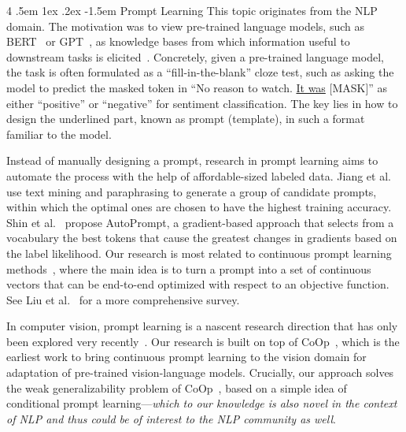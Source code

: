 \documentclass[10pt,twocolumn,letterpaper]{article}
\makeatletter
\renewcommand\paragraph{
  \@startsection{paragraph} %
  {4} %
  {\z@} %
  {.5em \@plus1ex \@minus.2ex} %
  {-1.5em} %
  {\normalfont\normalsize\bfseries} %
}
\makeatother
\begin{document}
\paragraph{Prompt Learning}
This topic originates from the NLP domain. The motivation was to view pre-trained language models, such as BERT~\cite{devlin2019bert} or GPT~\cite{radford2019language}, as knowledge bases from which information useful to downstream tasks is elicited~\cite{petroni2019language}. Concretely, given a pre-trained language model, the task is often formulated as a ``fill-in-the-blank'' cloze test, such as asking the model to predict the masked token in ``No reason to watch. \underline{It was} [MASK]'' as either ``positive'' or ``negative'' for sentiment classification. The key lies in how to design the underlined part, known as prompt (template), in such a format familiar to the model.

Instead of manually designing a prompt, research in prompt learning aims to automate the process with the help of affordable-sized labeled data. Jiang et al.~\cite{jiang2020can} use text mining and paraphrasing to generate a group of candidate prompts, within which the optimal ones are chosen to have the highest training accuracy. Shin et al.~\cite{shin2020autoprompt} propose AutoPrompt, a gradient-based approach that selects from a vocabulary the best tokens that cause the greatest changes in gradients based on the label likelihood. Our research is most related to continuous prompt learning methods~\cite{zhong2021factual,li2021prefix,lester2021power}, where the main idea is to turn a prompt into a set of continuous vectors that can be end-to-end optimized with respect to an objective function. See Liu et al.~\cite{liu2021pre} for a more comprehensive survey.

In computer vision, prompt learning is a nascent research direction that has only been explored very recently~\cite{zhou2021coop,yao2021cpt,rao2022denseclip,ju2021prompting,zhang2021pointclip}. Our research is built on top of CoOp~\cite{zhou2021coop}, which is the earliest work to bring continuous prompt learning to the vision domain for adaptation of pre-trained vision-language models. Crucially, our approach solves the weak generalizability problem of CoOp~\cite{zhou2021coop}, based on a simple idea of conditional prompt learning---\emph{which to our knowledge is also novel in the context of NLP and thus could be of interest to the NLP community as well}.
\end{document}
